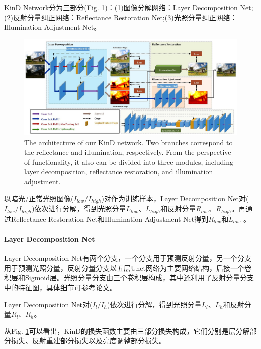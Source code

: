 \documentclass[letterpaper,12pt]{article}
\begin{document}
			KinD Network分为三部分(Fig. \ref{fig: network})：(1)图像分解网络：Layer Decomposition Net;(2)反射分量纠正网络：Reflectance Restoration Net;(3)光照分量纠正网络：Illumination Adjustment Net。
	
		\begin{figure}[htbp]
			\centering \includegraphics[width=0.8\columnwidth]{network}
			\captionsetup{font=scriptsize}
			\caption{
				\label{fig: network} %
				The architecture of our KinD network. Two branches correspond to the reflectance and illumination, respectively. From the perspective of functionality, it also can be divided into three modules, including layer decomposition, reflectance restoration, and illumination adjustment.
			}
		\end{figure}
	
		以暗光/正常光照图像($I_{low}/I_{high}$)对作为训练样本，Layer Decomposition Net对($I_{low}/I_{high}$)依次进行分解，得到光照分量$L_{low}$、$L_{high}$和反射分量$R_{low}$、$R_{high}$。再通过Reflectance Restoration Net和Illumination Adjustment Net得到$\tilde{R}_{low}$和$\tilde{L}_{low}$
	。
	
			\paragraph{Layer Decomposition Net}
		
				Layer Decomposition Net有两个分支，一个分支用于预测反射分量，另一个分支用于预测光照分量，反射分量分支以五层Unet网络为主要网络结构，后接一个卷积层和Sigmoid层。光照分量分支由三个卷积层构成，其中还利用了反射分量分支中的特征图，具体细节可参考论文。
				
				Layer Decomposition Net对($I_l / I_h$)依次进行分解，得到光照分量$L_l$、$L_h$和反射分量$R_l$、$R_h$。
				
				从Fig. \ref{fig: network}可以看出，KinD的损失函数主要由三部分损失构成，它们分别是层分解部分损失、反射重建部分损失以及亮度调整部分损失。
				
\end{document}
